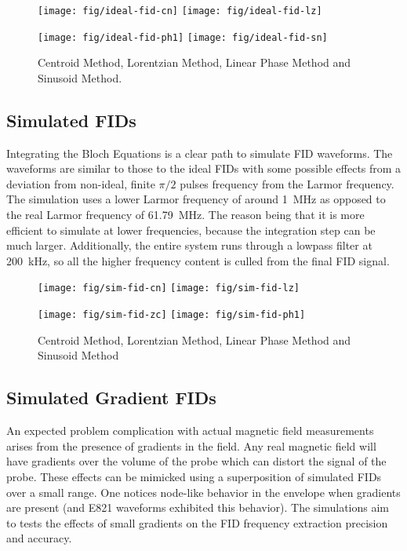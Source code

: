 \begin{figure}
    \label{fig:fid-ideal-freq-extraction}
    \texttt{[image: fig/ideal-fid-cn]}
    \texttt{[image: fig/ideal-fid-lz]}

    \texttt{[image: fig/ideal-fid-ph1]}
    \texttt{[image: fig/ideal-fid-sn]}
    \caption{Centroid Method, Lorentzian Method, Linear Phase Method and Sinusoid Method. }
\end{figure}

\subsection{Simulated FIDs}
Integrating the Bloch Equations is a clear path to simulate FID waveforms.  The waveforms are similar to those to the ideal FIDs with some possible effects from a deviation from non-ideal, finite $\pi/2$ pulses frequency from the Larmor frequency.  The simulation uses a lower Larmor frequency of around \SI{1}{\MHz} as opposed to the real Larmor frequency of \SI{61.79}{\MHz}.  The reason being that it is more efficient to simulate at lower frequencies, because the integration step can be much larger.  Additionally, the entire system runs through a lowpass filter at \SI{200}{\kHz}, so all the higher frequency content is culled from the final FID signal.

\begin{figure}
    \label{fig:fid-sim-freq-extraction}
    \texttt{[image: fig/sim-fid-cn]}
    \texttt{[image: fig/sim-fid-lz]}

    \texttt{[image: fig/sim-fid-zc]}
    \texttt{[image: fig/sim-fid-ph1]}
    \caption{Centroid Method, Lorentzian Method, Linear Phase Method and Sinusoid Method}
\end{figure}


\subsection{Simulated Gradient FIDs}
An expected problem complication with actual magnetic field measurements arises from the presence of gradients in the field.  Any real magnetic field will have gradients over the volume of the probe which can distort the signal of the probe.  These effects can be mimicked using a superposition of simulated FIDs over a small range.  One notices node-like behavior in the envelope when gradients are present (and E821 waveforms exhibited this behavior).  The simulations aim to tests the effects of small gradients on the FID frequency extraction precision and accuracy.

